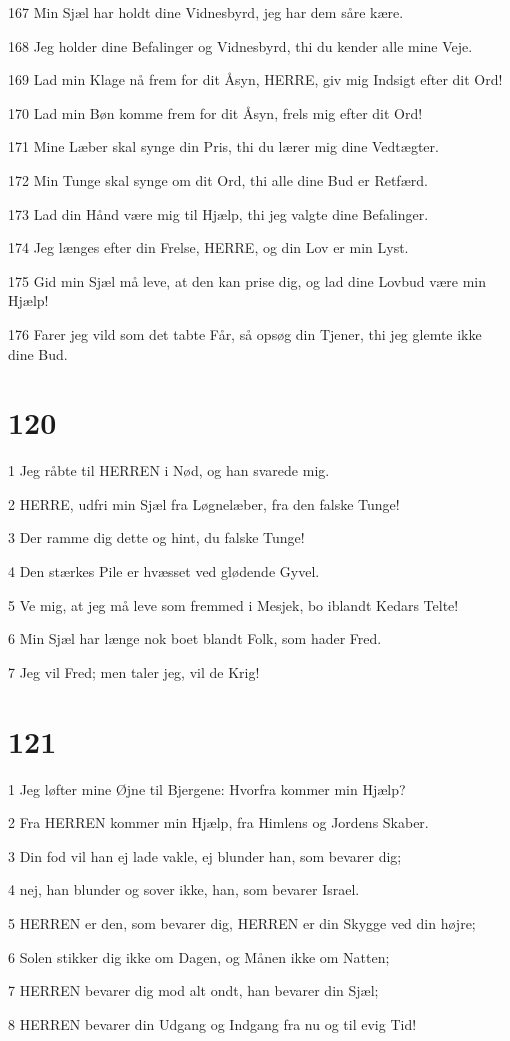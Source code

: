 \par 167 Min Sjæl har holdt dine Vidnesbyrd, jeg har dem såre kære.
\par 168 Jeg holder dine Befalinger og Vidnesbyrd, thi du kender alle mine Veje.
\par 169 Lad min Klage nå frem for dit Åsyn, HERRE, giv mig Indsigt efter dit Ord!
\par 170 Lad min Bøn komme frem for dit Åsyn, frels mig efter dit Ord!
\par 171 Mine Læber skal synge din Pris, thi du lærer mig dine Vedtægter.
\par 172 Min Tunge skal synge om dit Ord, thi alle dine Bud er Retfærd.
\par 173 Lad din Hånd være mig til Hjælp, thi jeg valgte dine Befalinger.
\par 174 Jeg længes efter din Frelse, HERRE, og din Lov er min Lyst.
\par 175 Gid min Sjæl må leve, at den kan prise dig, og lad dine Lovbud være min Hjælp!
\par 176 Farer jeg vild som det tabte Får, så opsøg din Tjener, thi jeg glemte ikke dine Bud.

\chapter{120}

\par 1 Jeg råbte til HERREN i Nød, og han svarede mig.
\par 2 HERRE, udfri min Sjæl fra Løgnelæber, fra den falske Tunge!
\par 3 Der ramme dig dette og hint, du falske Tunge!
\par 4 Den stærkes Pile er hvæsset ved glødende Gyvel.
\par 5 Ve mig, at jeg må leve som fremmed i Mesjek, bo iblandt Kedars Telte!
\par 6 Min Sjæl har længe nok boet blandt Folk, som hader Fred.
\par 7 Jeg vil Fred; men taler jeg, vil de Krig!

\chapter{121}

\par 1 Jeg løfter mine Øjne til Bjergene: Hvorfra kommer min Hjælp?
\par 2 Fra HERREN kommer min Hjælp, fra Himlens og Jordens Skaber.
\par 3 Din fod vil han ej lade vakle, ej blunder han, som bevarer dig;
\par 4 nej, han blunder og sover ikke, han, som bevarer Israel.
\par 5 HERREN er den, som bevarer dig, HERREN er din Skygge ved din højre;
\par 6 Solen stikker dig ikke om Dagen, og Månen ikke om Natten;
\par 7 HERREN bevarer dig mod alt ondt, han bevarer din Sjæl;
\par 8 HERREN bevarer din Udgang og Indgang fra nu og til evig Tid!

